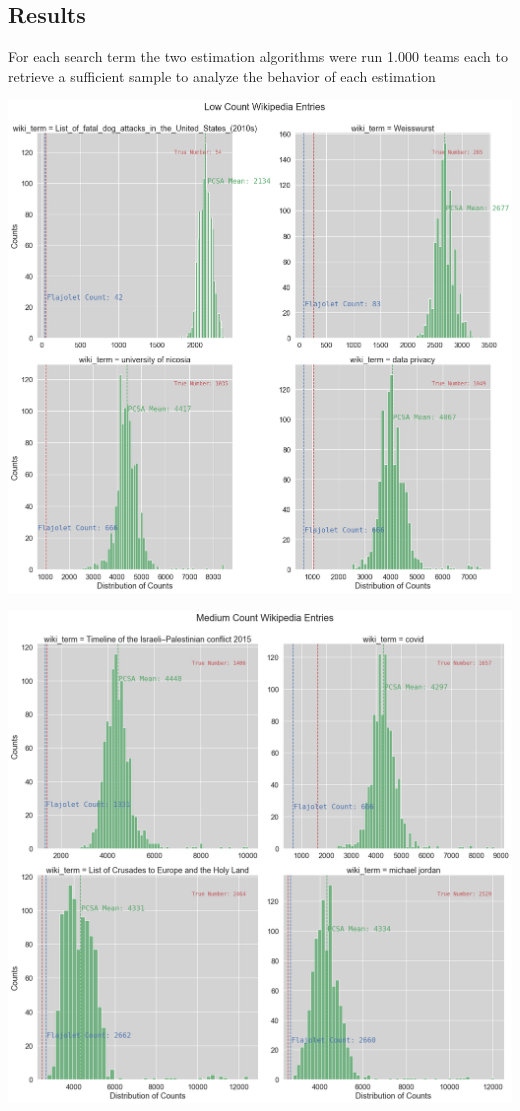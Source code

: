 \documentclass[11pt]{article}
\begin{document}
\subsection{Results}
For each search term the two estimation algorithms were run 1.000 teams each to retrieve a sufficient sample to analyze the behavior of each estimation \begin{center}

\begin{minipage}{1.2\linewidth}
\includegraphics[width=\linewidth]{images/distribution_small.png}
\end{minipage}%
\hfill
\begin{minipage}{1.2\linewidth}
\includegraphics[width=\linewidth]{images/distribution_med.png}

\end{minipage}
\end{center}
\end{document}

